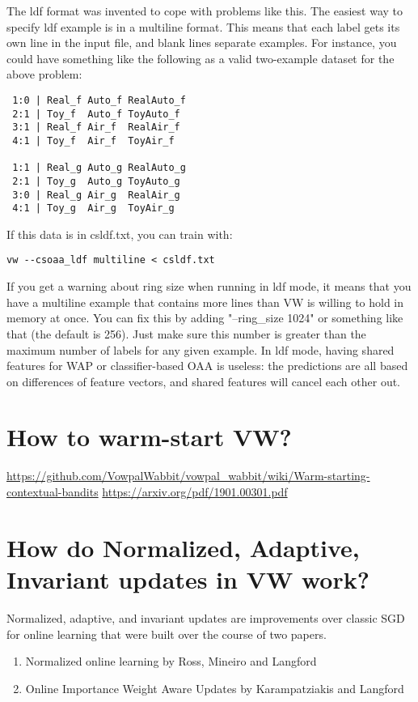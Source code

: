 \documentclass[preview,border={30 30 30 30}]{standalone}
\begin{document}
The ldf format was invented to cope with problems like this. The easiest way to specify ldf example is in a multiline format. This means that each label gets its own line in the input file, and blank lines separate examples. For instance, you could have something like the following as a valid two-example dataset for the above problem:

\begin{verbatim}
 1:0 | Real_f Auto_f RealAuto_f
 2:1 | Toy_f  Auto_f ToyAuto_f
 3:1 | Real_f Air_f  RealAir_f
 4:1 | Toy_f  Air_f  ToyAir_f
 
 1:1 | Real_g Auto_g RealAuto_g
 2:1 | Toy_g  Auto_g ToyAuto_g
 3:0 | Real_g Air_g  RealAir_g
 4:1 | Toy_g  Air_g  ToyAir_g
\end{verbatim}

If this data is in csldf.txt, you can train with:

\verb|vw --csoaa_ldf multiline < csldf.txt|

If you get a warning about ring size when running in ldf mode, it means that you have a multiline example that contains more lines than VW is willing to hold in memory at once. You can fix this by adding "--ring\_size 1024" or something like that (the default is 256). Just make sure this number is greater than the maximum number of labels for any given example.
In ldf mode, having shared features for WAP or classifier-based OAA is useless: the predictions are all based on differences of feature vectors, and shared features will cancel each other out.

\section{How to warm-start VW?}
\url{https://github.com/VowpalWabbit/vowpal_wabbit/wiki/Warm-starting-contextual-bandits}
\url{https://arxiv.org/pdf/1901.00301.pdf}



\section{How do Normalized, Adaptive, Invariant updates in VW work?}
Normalized, adaptive, and invariant updates are improvements over classic SGD for online learning that were built over the course of two papers.

\begin{enumerate}
    \item Normalized online learning by Ross, Mineiro and Langford
    \item Online Importance Weight Aware Updates by Karampatziakis and Langford
\end{enumerate}
\end{document}
